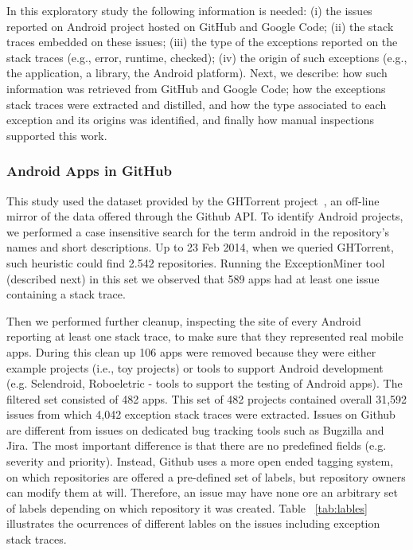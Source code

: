 \documentclass[conference]{IEEEtran}
\begin{document}
In this exploratory study the following information is needed: (i) the issues reported on Android project hosted on 
GitHub and Google Code; (ii) the stack traces embedded on these issues; (iii) the type of the exceptions
 reported on the stack traces (e.g., error, runtime, checked); (iv) the origin of such exceptions 
(e.g., the application, a library, the Android platform). Next, we describe: how such information 
was retrieved from GitHub and Google Code; how the exceptions stack traces were extracted and distilled,
 and how the type associated to each exception and its origins was identified, and finally how manual
inspections supported this work.


\subsubsection{Android Apps in GitHub}
\label{sec:git}


This study used the dataset provided by the GHTorrent project~\cite{Gousi13}, 
an off-line mirror of the data  offered through the Github API.  
To identify Android projects, we performed a case insensitive search for the
term \textsf{android} in the repository's names and short descriptions.  
Up to 23 Feb 2014,  when we queried GHTorrent, such heuristic could
 find 2.542 repositories. Running the ExceptionMiner tool (described next)
 in this set we observed that 589 apps had at least one issue containing a stack trace.

Then we performed further cleanup, inspecting the site of every Android
reporting at least one stack trace, to make sure that they represented real
mobile apps. During this clean up 106 apps were removed because they were either
example projects (i.e., toy projects) or tools to support Android development
(e.g. Selendroid, Roboeletric - tools to support the testing of Android apps).
The filtered set consisted of 482 apps. This set of 482 projects contained overall 31,592 issues from which 4,042 exception stack traces 
were extracted. Issues on Github are different from issues on dedicated bug tracking tools such as 
Bugzilla and Jira. The most important difference is that there are no predefined fields
  (e.g. severity and priority). Instead, Github uses a more open ended tagging system, on which
repositories are offered a pre-defined set of labels, but repository owners can modify 
them at will. Therefore, an issue may have none ore an arbitrary set of labels depending 
on which repository it was created. Table ~\ref{tab:lables} illustrates the ocurrences of different lables 
on the issues including exception stack traces.
\end{document}
